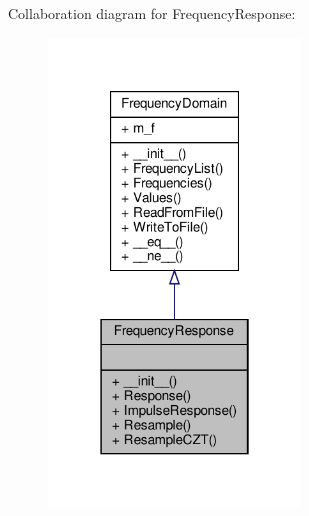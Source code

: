Collaboration diagram for Frequency\+Response\+:
\nopagebreak
\begin{figure}[H]
\begin{center}
\leavevmode
\includegraphics[width=190pt]{classSignalIntegrity_1_1FrequencyDomain_1_1FrequencyResponse_1_1FrequencyResponse__coll__graph}
\end{center}
\end{figure}
